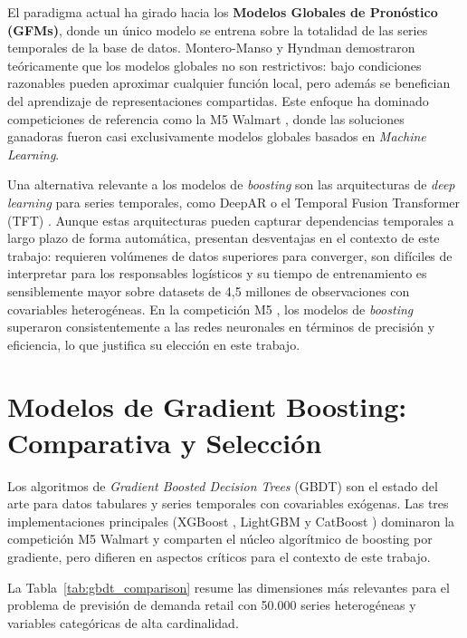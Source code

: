 El paradigma actual ha girado hacia los \textbf{Modelos Globales de Pronóstico (GFMs)}, donde un único modelo se entrena sobre la totalidad de las series temporales de la base de datos. Montero-Manso y Hyndman \cite{montero2021principles} demostraron teóricamente que los modelos globales no son restrictivos: bajo condiciones razonables pueden aproximar cualquier función local, pero además se benefician del aprendizaje de representaciones compartidas. Este enfoque ha dominado competiciones de referencia como la M5 Walmart \cite{makridakis2022m5}, donde las soluciones ganadoras fueron casi exclusivamente modelos globales basados en \textit{Machine Learning}.

Una alternativa relevante a los modelos de \textit{boosting} son las arquitecturas de \textit{deep learning} para series temporales, como DeepAR \cite{salinas2020deepar} o el Temporal Fusion Transformer (TFT) \cite{lim2021temporal}. Aunque estas arquitecturas pueden capturar dependencias temporales a largo plazo de forma automática, presentan desventajas en el contexto de este trabajo: requieren volúmenes de datos superiores para converger, son difíciles de interpretar para los responsables logísticos y su tiempo de entrenamiento es sensiblemente mayor sobre datasets de 4,5 millones de observaciones con covariables heterogéneas. En la competición M5 \cite{makridakis2022m5}, los modelos de \textit{boosting} superaron consistentemente a las redes neuronales en términos de precisión y eficiencia, lo que justifica su elección en este trabajo.

\section{Modelos de Gradient Boosting: Comparativa y Selección}
Los algoritmos de \textit{Gradient Boosted Decision Trees} (GBDT) son el estado del arte para datos tabulares y series temporales con covariables exógenas. Las tres implementaciones principales (XGBoost \cite{chen2016xgboost}, LightGBM \cite{ke2017lightgbm} y CatBoost \cite{prokhorenkova2018catboost}) dominaron la competición M5 Walmart y comparten el núcleo algorítmico de boosting por gradiente, pero difieren en aspectos críticos para el contexto de este trabajo.

La Tabla~\ref{tab:gbdt_comparison} resume las dimensiones más relevantes para el problema de previsión de demanda retail con 50.000 series heterogéneas y variables categóricas de alta cardinalidad.

